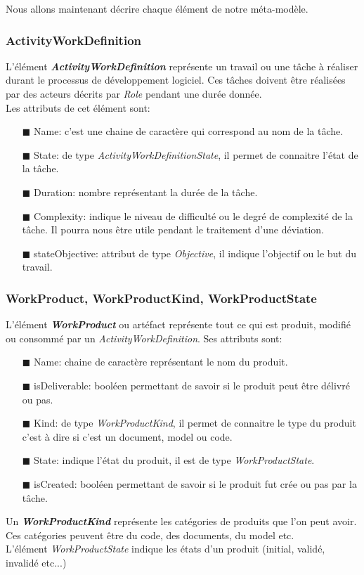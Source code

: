 Nous allons maintenant décrire chaque élément de notre méta-modèle.
\subsubsection*{ActivityWorkDefinition}
L'élément \textbf{\textit{ActivityWorkDefinition}} représente un travail ou une tâche à réaliser durant le processus de développement logiciel. Ces tâches doivent être réalisées par des acteurs décrits par \textit{Role} pendant une durée donnée.\\
Les attributs de cet élément sont:\\
\begin{itemize}
\item[\tiny{$\blacksquare$}] Name: c'est une chaine de caractère qui correspond au nom de la tâche.
\item[\tiny{$\blacksquare$}] State: de type \textit{ActivityWorkDefinitionState}, il permet de connaitre l'état de la tâche.
\item[\tiny{$\blacksquare$}] Duration: nombre représentant la durée de la tâche.
\item[\tiny{$\blacksquare$}] Complexity: indique le niveau de difficulté ou le degré de complexité de la tâche. Il pourra nous être utile pendant le traitement d'une déviation.
\item[\tiny{$\blacksquare$}] stateObjective: attribut de type \textit{Objective}, il indique l'objectif ou le but du travail.
\end{itemize}
\subsubsection*{WorkProduct, WorkProductKind, WorkProductState}
L'élément \textbf{\textit{WorkProduct}} ou artéfact représente tout ce qui est produit, modifié ou consommé par un \textit{ActivityWorkDefinition}. Ses attributs sont:\\
\begin{itemize}
\item[\tiny{$\blacksquare$}] Name: chaine de caractère représentant le nom du produit.
\item[\tiny{$\blacksquare$}] isDeliverable: booléen permettant de savoir si le produit peut être délivré ou pas.
\item[\tiny{$\blacksquare$}] Kind: de type \textit{WorkProductKind}, il permet de connaitre le type du produit c'est à dire si c'est un document, model ou code.
\item[\tiny{$\blacksquare$}] State: indique l'état du produit, il est de type \textit{WorkProductState}.
\item[\tiny{$\blacksquare$}] isCreated: booléen permettant de savoir si le produit fut crée ou pas par la tâche.
\end{itemize}
Un \textbf{\textit{WorkProductKind}} représente les catégories de produits que l'on peut avoir. Ces catégories peuvent être du code, des documents, du model etc.\\
L'élément \textit{WorkProductState} indique les états d'un produit (initial, validé, invalidé etc...)

